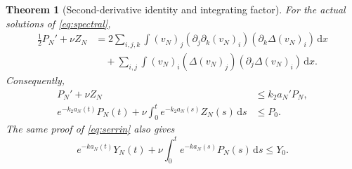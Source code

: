 \documentclass[11pt,a4paper]{article}
\newtheorem{theorem}{Theorem}[section]
\theoremstyle{definition}\newtheorem{definition}[theorem]{Definition}
\theoremstyle{remark}\newtheorem{remark}[theorem]{Remark}
\newcommand{\dd}{\,\mathrm d}
\numberwithin{equation}{section}
\begin{document}
\begin{theorem}[Second-derivative identity and integrating factor]\label{thm:H2}
For the actual solutions of \eqref{eq:spectral},
\begin{equation}\label{eq:H2exact}
 \begin{split}
 \tfrac12P_N'+\nu Z_N
 &=2\sum_{i,j,k}\int (v_N)_j(\partial_j\partial_k(v_N)_i)
                              (\partial_k\Delta(v_N)_i)\dd x\\
 &\quad+\sum_{i,j}\int (v_N)_i(\Delta(v_N)_j)
                                     (\partial_j\Delta(v_N)_i)\dd x.
 \end{split}
\end{equation}
Consequently,
\begin{align}
 P_N'+\nu Z_N&\le k_2 a_N'P_N,\label{eq:H2ineq}\\
 e^{-k_2a_N(t)}P_N(t)+\nu\int_0^t e^{-k_2a_N(s)}Z_N(s)\dd s
 &\le P_0.\label{eq:weightedH2}
\end{align}
The same proof of \eqref{eq:serrin} also gives
\begin{equation}\label{eq:weightedH1}
 e^{-ka_N(t)}Y_N(t)+\nu\int_0^t e^{-ka_N(s)}P_N(s)\dd s\le Y_0.
\end{equation}
\end{theorem}
\end{document}

